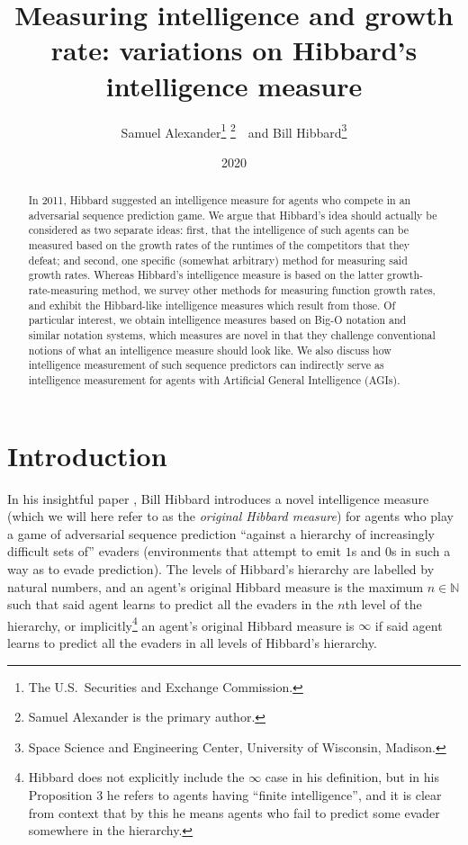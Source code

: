 \documentclass{article}
\title{Measuring intelligence and growth rate: variations on
Hibbard's intelligence measure}
\author{Samuel Alexander\thanks{The U.S.\ Securities and Exchange Commission.}
\thanks{Samuel Alexander is the primary author.}\ \ and Bill Hibbard\thanks{Space Science
and Engineering Center, University of Wisconsin, Madison.}}
\date{2020}
\begin{document}
\maketitle

\begin{abstract}
    In 2011, Hibbard suggested an intelligence measure for agents
    who compete in an adversarial sequence prediction game. We argue
    that Hibbard's idea should actually be considered as two separate
    ideas: first, that the intelligence of such agents can be measured
    based on the growth rates of the runtimes of the competitors that
    they defeat; and second, one specific (somewhat arbitrary) method for measuring said
    growth rates. Whereas Hibbard's intelligence measure is based on the latter
    growth-rate-measuring method, we survey
    other methods for measuring function
    growth rates, and exhibit the Hibbard-like intelligence measures
    which result from those. Of particular interest, we obtain intelligence measures
    based on Big-O notation and similar notation systems, which measures
    are novel in that they challenge conventional notions of what an
    intelligence measure should look like. We also discuss how intelligence measurement
    of such sequence predictors can indirectly serve as intelligence measurement for
    agents with Artificial General Intelligence (AGIs).
\end{abstract}

\section{Introduction}

In his insightful paper \cite{hibbard}, Bill Hibbard introduces a novel
intelligence measure (which we will here refer to as the \emph{original Hibbard measure})
for agents who play a game of adversarial sequence prediction
\cite{hibbard2008adversarial}
``against a hierarchy of increasingly difficult sets of'' evaders (environments that attempt
to emit $1$s and $0$s in such a way as to evade prediction).
The levels of Hibbard's hierarchy are labelled by natural numbers, and
an agent's original Hibbard measure is the maximum $n\in\mathbb N$ such that
said agent learns to predict all the evaders in the $n$th level of the hierarchy,
or implicitly\footnote{Hibbard does not explicitly include the $\infty$ case in his
definition, but in his Proposition 3 he refers to agents having ``finite intelligence'', and
it is clear from context that by this he means agents who fail to predict some evader
somewhere in the hierarchy.} an agent's original Hibbard measure is $\infty$
if said agent learns to predict all the evaders in all levels of Hibbard's hierarchy.
\end{document}
